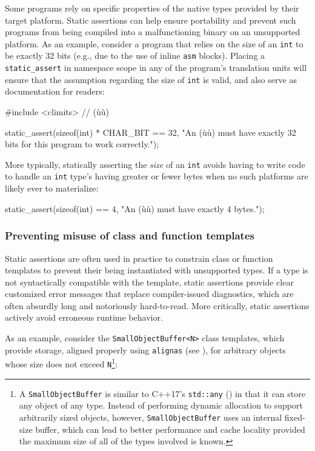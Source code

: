 Some programs rely on specific properties of the native types provided
by their target platform. Static assertions can help ensure portability
and prevent such programs from being compiled into a malfunctioning
binary on an unsupported platform. As an example, consider a
program that relies on the size of an \lstinline!int! to be exactly 32
bits (e.g., due to the use of inline \lstinline!asm! blocks). Placing a
\lstinline!static_assert! in namespace scope in any of the program's
translation units will ensure that the assumption regarding the size
of \lstinline!int! is valid, and also serve as documentation for readers:

\begin{emcppslisting}
#include <climits>  // (ù{}ù)

static_assert(sizeof(int) * CHAR_BIT == 32,
    "An (ù{}ù) must have exactly 32 bits for this program to work correctly.");
\end{emcppslisting}

\noindent More typically, statically asserting the \emph{size} of an \lstinline!int!
avoids having to write code to handle an \lstinline!int! type's having
greater or fewer bytes when no such platforms are likely ever to
materialize:

\begin{emcppslisting}
static_assert(sizeof(int) == 4, "An (ù{}ù) must have exactly 4 bytes.");
\end{emcppslisting}


\subsubsection[Preventing misuse of class and function templates]{Preventing misuse of class and function templates}\label{preventing-misuse-of-class-and-function-templates}

Static assertions are often used in practice to constrain class or function templates to prevent their being instantiated with unsupported types. If a type is not syntactically compatible with the template, static assertions provide clear customized error messages that replace compiler-issued diagnostics, which are often absurdly long and notoriously hard-to-read. More critically, static assertions actively avoid erroneous runtime behavior.

As an example, consider the \lstinline!SmallObjectBuffer<N>! class
templates, which provide storage, aligned properly using \lstinline!alignas! (see
),
for arbitrary objects whose size does
not exceed \lstinline!N!{\cprotect\footnote{A \lstinline!SmallObjectBuffer! is
  similar to C++17's \lstinline!std::any! (\cite{cpprefstdany}) in
  that it can store any object of any type. Instead of performing
  dynamic allocation to support arbitrarily sized objects, however,
  \lstinline!SmallObjectBuffer! uses an internal fixed-size buffer, which
  can lead to better performance and cache locality provided the
  maximum size of all of the types involved is known.}}:

